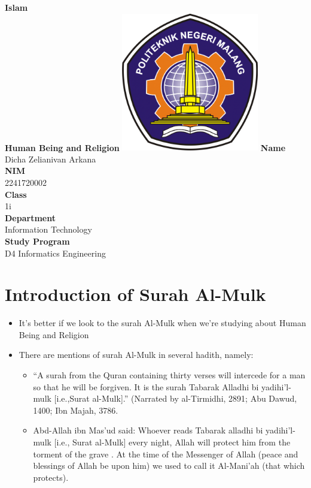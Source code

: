 \documentclass[12pt,titlepage]{article}
\newcommand{\vSubject}{Islam}
\newcommand{\vSubtitle}{Human Being and Religion}
\newcommand{\vName}{Dicha Zelianivan Arkana}
\newcommand{\vNIM}{2241720002}
\newcommand{\vClass}{1i}
\newcommand{\vDepartment}{Information Technology}
\newcommand{\vStudyProgram}{D4 Informatics Engineering}
\begin{document}
\begin{titlepage}
    \centering
    \vfill
    {\bfseries\LARGE
        \vSubject\\
        \vskip0.25cm
        \vSubtitle
    }
    \vfill
    \includegraphics[width=6cm]{images/polinema-logo.png}
    \vfill
    {
        \textbf{Name}\\
        \vName\\
        \vskip0.5cm
        \textbf{NIM}\\
        \vNIM\\
        \vskip0.5cm
        \textbf{Class}\\
        \vClass\\
        \vskip0.5cm
        \textbf{Department}\\
        \vDepartment\\
        \vskip0.5cm
        \textbf{Study Program}\\
        \vStudyProgram
    }
\end{titlepage}

\renewcommand{\thesection}{\Alph{section}.}

\section{Introduction of Surah Al-Mulk}
\begin{itemize}
    \item It's better if we look to the surah Al-Mulk when we're studying about Human Being and Religion
    \item {
        There are mentions of surah Al-Mulk in several hadith, namely:
        \begin{itemize}
            \item {
                “A surah from the Quran containing thirty verses will intercede for a man 
                so that he will be forgiven. It is the surah Tabarak Alladhi bi yadihi’l-mulk 
                [i.e.,Surat al-Mulk].” (Narrated by al-Tirmidhi, 2891; Abu Dawud, 1400; Ibn Majah, 3786.
            }
            \item {
                Abd-Allah ibn Mas'ud said: Whoever reads Tabarak alladhi bi
                yadihi'l-mulk [i.e., Surat al-Mulk] every night, Allah will protect him from the torment
                of the grave . At the time of the Messenger of Allah (peace and blessings of Allah be
                upon him) we used to call it Al-Mani'ah (that which protects).
            }
        \end{itemize}
    }
\end{itemize}
\end{document}
